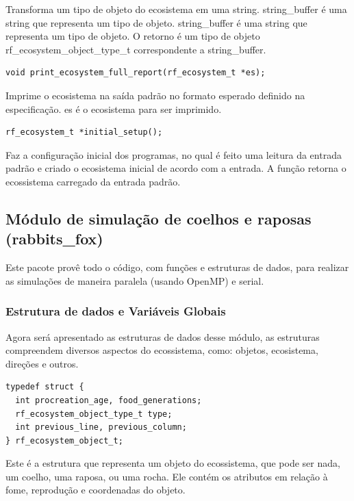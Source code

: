 \documentclass[12pt]{article}
\begin{document}
Transforma um tipo de objeto do ecosistema em uma string. string\_buffer é uma string que representa um tipo de objeto. string\_buffer é uma string que representa um tipo de objeto. O retorno é um tipo de objeto rf\_ecosystem\_object\_type\_t correspondente a string\_buffer.


\begin{verbatim}
void print_ecosystem_full_report(rf_ecosystem_t *es);
      \end{verbatim}

Imprime o ecosistema na saída padrão no formato esperado definido na especificação. es é o ecosistema para ser imprimido.

\begin{verbatim}
rf_ecosystem_t *initial_setup();
      \end{verbatim}

Faz a configuração inicial dos programas, no qual é feito uma leitura da entrada padrão e criado o ecosistema inicial de acordo com a entrada. A função retorna o ecossistema carregado da entrada padrão.

\subsection{Módulo de simulação de coelhos e raposas (rabbits\_fox)}

Este pacote provê todo o código, com funções e estruturas de dados, para realizar as simulações de maneira paralela (usando OpenMP) e serial.

\subsubsection{Estrutura de dados e Variáveis Globais}

Agora será apresentado as estruturas de dados desse módulo, as estruturas compreendem diversos aspectos do ecossistema, como: objetos, ecosistema, direções e outros.


\begin{verbatim}
typedef struct {
  int procreation_age, food_generations;
  rf_ecosystem_object_type_t type;
  int previous_line, previous_column;
} rf_ecosystem_object_t;
      \end{verbatim}

Este é a estrutura que representa um objeto do ecossistema, que pode ser nada, um coelho, uma raposa, ou uma rocha. Ele contém os atributos em relação à fome, reprodução e coordenadas do objeto.
\end{document}
